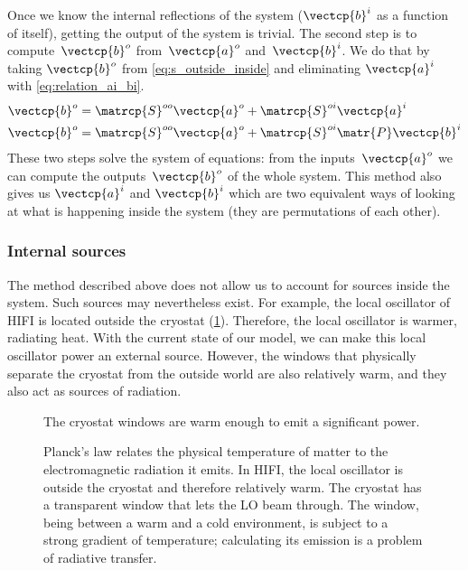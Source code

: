 \begin{refsection}
Once we know the internal reflections of the system ($\vectcp{b}^i$ as a function of itself), getting the output of the system is trivial.
The second step is to compute~$\vectcp{b}^o$ from~$\vectcp{a}^o$ and~$\vectcp{b}^i$.
We do that by taking $\vectcp{b}^o$ from \cref{eq:s_outside_inside} and eliminating $\vectcp{a}^i$ with \cref{eq:relation_ai_bi}.
\begin{subequations}
\begin{align}
    \vectcp{b}^o &= \matrcp{S}^{oo}\vectcp{a}^o + \matrcp{S}^{oi}\vectcp{a}^i \\
    \vectcp{b}^o &= \matrcp{S}^{oo}\vectcp{a}^o + \matrcp{S}^{oi}\matr{P}\vectcp{b}^i \label{eq:compute_bo}
\end{align}
\end{subequations}
These two steps solve the system of equations: from the inputs~$\vectcp{a}^o$ we can compute the outputs~$\vectcp{b}^o$ of the whole system.
This method also gives us $\vectcp{a}^i$ and $\vectcp{b}^i$ which are two equivalent ways of looking at what is happening inside the system (they are permutations of each other).



\subsubsection{Internal sources}

The method described above does not allow us to account for sources inside the system.
Such sources may nevertheless exist.
For example, the local oscillator of HIFI is located outside the cryostat (\cref{fig:internal_sources_windows}).
Therefore, the local oscillator is warmer, radiating heat.
With the current state of our model, we can make this local oscillator power an external source.
However, the windows that physically separate the cryostat from the outside world are also relatively warm, and they also act as sources of radiation.

\begin{figure}
    \centering
    
    \caption{The cryostat windows are warm enough to emit a significant power.}
    \caption*{
        Planck's law relates the physical temperature of matter to the electromagnetic radiation it emits.
        In HIFI, the local oscillator is outside the cryostat and therefore relatively warm.
        The cryostat has a transparent window that lets the LO beam through.%
        The window, being between a warm and a cold environment, is subject to a strong gradient of temperature; calculating its emission is a problem of radiative transfer.}
    \label{fig:internal_sources_windows} 
\end{figure}


\end{refsection}
